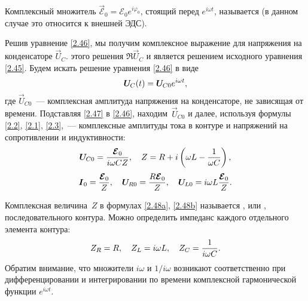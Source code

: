 Комплексный множитель $\vec{\mathcal{E}}_0=\mathcal{E}_0e^{i\varphi_0}$, стоящий
перед $e^{i\omega t}$, называется  (в данном
случае это относится к внешней ЭДС). 

Решив уравнение \eqref{2.46}, мы получим
комплексное выражение для напряжения на конденсаторе $\vec{U}_{\! C}$. 
 этого решения
$\Re \vec{U}_{\! C}$ и является решением исходного уравнения \eqref{2.45}.
Будем искать решение уравнения \eqref{2.46} в виде
\begin{equation}\eqmark{2.47}
\vec{U}_{\! C}(t)=\vec{U}_{\! C0}e^{i\omega t},
\end{equation}
где $\vec{U}_{\! C0}$~--- комплексная амплитуда напряжения на конденсаторе, не
зависящая от времени. Подставляя \eqref{2.47} в \eqref{2.46},
находим~$\vec{U}_{\! C0}$ и далее, используя формулы \eqref{2.2}, \eqref{2.1},
\eqref{2.3},~--- комплексные амплитуды тока в контуре и напряжений на
сопротивлении и индуктивности:
		\begin{equation}
			\eqmark{2.48a}
	\vec{U}_{\! C0}=\frac{\vec{\mathcal{E}}_0}{i\omega CZ}, 
    \quad Z=R+i\left(\omega L-\frac{1}{\omega C}\right),
		\end{equation}
		\begin{equation}
			\eqmark{2.48b}
			\vec I_0=\frac{\vec{\mathcal{E}}_0}{Z}, \quad
			\vec{U}_{\! R0}=\frac{R\vec{\mathcal{E}}_0}{Z}, \quad
			\vec{U}_{\! L0}=i\omega L\frac{\vec{\mathcal{E}}_0}{Z}.
		\end{equation}

Комплексная величина~$Z$ в формулах \eqref{2.48a}, \eqref{2.48b} называется
, или ,
последовательного контура.
Можно определить импеданс каждого отдельного элемента контура:
\begin{equation}
	\eqmark{2.49}
			Z_R=R, \quad Z_L=i\omega L, \quad Z_C=\frac{1}{i\omega C}.
\end{equation}
Обратим внимание, что множители $i\omega$ и $1/i\omega$
возникают соответственно при дифференцировании и интегрировании по времени 
комплексной гармонической функции $e^{i\omega t}$.

